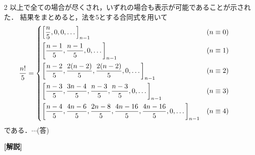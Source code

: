 \documentclass[../../main.tex]{subfiles}
\begin{document}
\begin{multicols}{2}
  以上で全ての場合が尽くされ，いずれの場合も表示が可能であることが示された．
  結果をまとめると，法を$5$とする合同式を用いて
  \begin{align}
    \dfrac{n!}{5}
    & =
    \begin{dcases}
      \left[\dfrac{n}{5}, 0, 0, \dots\right]_{n-1}                                                                 & (n \equiv 0) \\
      \left[\dfrac{n-1}{5}, \dfrac{n-1}{5}, 0, \dots\right]_{n-1}                                                   & (n \equiv 1) \\
      \left[\dfrac{n-2}{5}, \dfrac{2(n-2)}{5}, \dfrac{2(n-2)}{5}, 0, \dots\right]_{n-1}                              & (n \equiv 2) \\
      \left[\dfrac{n-3}{5}, \dfrac{3n-4}{5}, \dfrac{n-3}{5}, \dfrac{n-3}{5}, 0, \dots\right]_{n-1}                    & (n \equiv 3) \\
      \left[\dfrac{n-4}{5}, \dfrac{4n-6}{5}, \dfrac{2n-8}{5}, \dfrac{4n-16}{5}, \dfrac{4n-16}{5},0,\dots \right]_{n-1} & (n \equiv 4)
    \end{dcases}
  \end{align}
  である．$\cdots$(答)

  {\bf [解説]}

  \newpage
\end{multicols}
\end{document}
